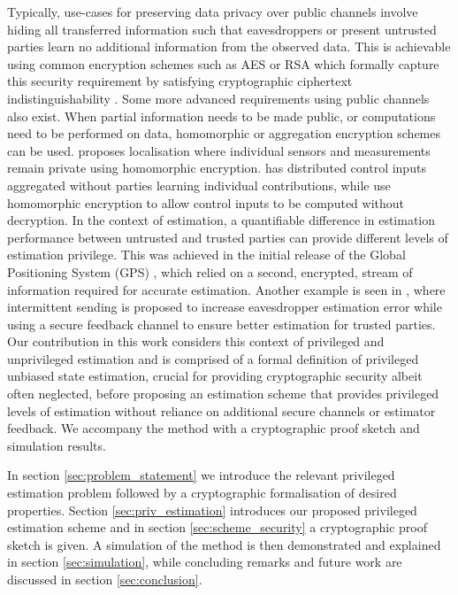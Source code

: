 \documentclass[letterpaper, 10 pt, conference]{IEEEtran}
\theoremstyle{definition}
\begin{document}
Typically, use-cases for preserving data privacy over public channels involve hiding all transferred information such that eavesdroppers or present untrusted parties learn no additional information from the observed data. This is achievable using common encryption schemes such as AES \cite{gueronIntelAdvancedEncryption2010} or RSA \cite{rivestMethodObtainingDigital1978} which formally capture this security requirement by satisfying cryptographic ciphertext indistinguishability \cite{katzIntroductionModernCryptography2008}. Some more advanced requirements using public channels also exist. When partial information needs to be made public, or computations need to be performed on data, homomorphic or aggregation encryption schemes can be used. \cite{alanwarPrOLocResilientLocalization2017} proposes localisation where individual sensors and measurements remain private using homomorphic encryption. \cite{alexandruPrivateWeightedSum2020} has distributed control inputs aggregated without parties learning individual contributions, while \cite{alexandruEncryptedCooperativeControl2019,farokhiSecurePrivateControl2017} use homomorphic encryption to allow control inputs to be computed without decryption. In the context of estimation, a quantifiable difference in estimation performance between untrusted and trusted parties can provide different levels of estimation privilege. This was achieved in the initial release of the Global Positioning System (GPS) \cite{grovesPrinciplesGNSSInertial2015}, which relied on a second, encrypted, stream of information required for accurate estimation. Another example is seen in \cite{leongTransmissionSchedulingRemote2019}, where intermittent sending is proposed to increase eavesdropper estimation error while using a secure feedback channel to ensure better estimation for trusted parties. Our contribution in this work considers this context of privileged and unprivileged estimation and is comprised of a formal definition of privileged unbiased state estimation, crucial for providing cryptographic security albeit often neglected, before proposing an estimation scheme that provides privileged levels of estimation without reliance on additional secure channels or estimator feedback. We accompany the method with a cryptographic proof sketch and simulation results.

In section \ref{sec:problem_statement} we introduce the relevant privileged estimation problem followed by a cryptographic formalisation of desired properties. Section \ref{sec:priv_estimation} introduces our proposed privileged estimation scheme and in section \ref{sec:scheme_security} a cryptographic proof sketch is given. A simulation of the method is then demonstrated and explained in section \ref{sec:simulation}, while concluding remarks and future work are discussed in section \ref{sec:conclusion}.
\end{document}

